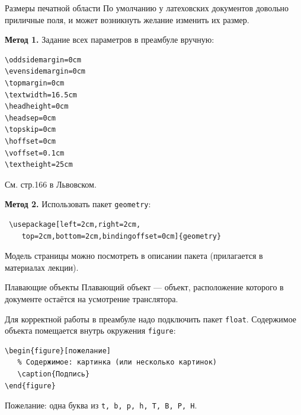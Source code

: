 \documentclass[ mathserif]{beamer}
\begin{document}
%
%
%
\begin{frame}[fragile]{Размеры печатной области}
 По умолчанию у латеховских документов довольно приличные поля, и может возникнуть желание изменить их размер.

\textbf{Метод 1.} Задание всех параметров в преамбуле вручную:
\begin{verbatim}
\oddsidemargin=0cm
\evensidemargin=0cm
\topmargin=0cm
\textwidth=16.5cm
\headheight=0cm
\headsep=0cm
\topskip=0cm
\hoffset=0cm
\voffset=0.1cm
\textheight=25cm
\end{verbatim}
См. стр.166 в Львовском.
\end{frame}
%
%
%
\begin{frame}[fragile]
 \textbf{Метод 2.} Использовать пакет \texttt{geometry}:

\begin{verbatim}
 \usepackage[left=2cm,right=2cm,
    top=2cm,bottom=2cm,bindingoffset=0cm]{geometry}
\end{verbatim}

Модель страницы можно посмотреть в описании пакета (прилагается в материалах лекции).
\end{frame}
%
%
%

\begin{frame}[fragile]{Плавающие объекты}
Плавающий объект --- объект, расположение которого в документе остаётся на усмотрение транслятора. 

Для корректной работы в преамбуле надо подключить пакет \texttt{float}. Содержимое объекта помещается внутрь окружения \texttt{figure}:

\begin{verbatim}
\begin{figure}[пожелание]
   % Содержимое: картинка (или несколько картинок)
   \caption{Подпись}
\end{figure}
\end{verbatim}
Пожелание: одна буква из \texttt{t, b, p, h, T, B, P, H}.
\end{frame}
\end{document}

